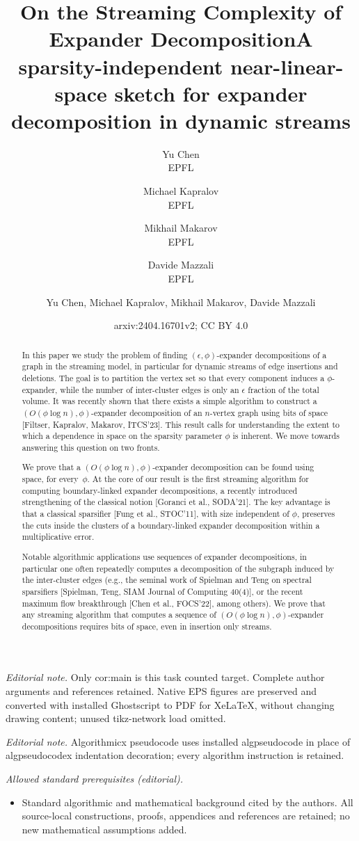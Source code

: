 \documentclass[epsfig,letter,11pt]{article}
\title{On the Streaming Complexity of Expander Decomposition}
\author{
	Yu Chen\\
	EPFL\\
	\and
	Michael Kapralov\\
	EPFL\\
	\and
	Mikhail Makarov\\
	EPFL\\
	\and
	Davide Mazzali\\
	EPFL\\}
\date{}
\title{A sparsity-independent near-linear-space sketch for expander decomposition in dynamic streams}
\author{Yu Chen, Michael Kapralov, Mikhail Makarov, Davide Mazzali}
\date{arxiv:2404.16701v2; CC BY 4.0}
\numberwithin{equation}{section}
\begin{document}
\maketitle
\noindent\textit{Editorial note.} Only cor:main is this task counted target. Complete author arguments and references retained. Native EPS figures are preserved and converted with installed Ghostscript to PDF for XeLaTeX, without changing drawing content; unused tikz-network load omitted.\par\medskip
\noindent\textit{Editorial note.} Algorithmicx pseudocode uses installed algpseudocode in place of algpseudocodex indentation decoration; every algorithm instruction is retained.\par\medskip
\noindent\textit{Allowed standard prerequisites (editorial).}\begin{itemize}
\item Standard algorithmic and mathematical background cited by the authors. All source-local constructions, proofs, appendices and references are retained; no new mathematical assumptions added.
\end{itemize}\medskip
\thispagestyle{empty}
\begin{abstract}
\noindent
In this paper we study the problem of finding $(\epsilon, \phi)$-expander decompositions of a graph in the streaming model, in particular for dynamic streams of edge insertions and deletions. The goal is to partition the vertex set so that every component induces a $\phi$-expander, while the number of inter-cluster edges is only an $\epsilon$ fraction of the total volume. It was recently shown that there exists a simple algorithm to construct a $(O(\phi \log n), \phi)$-expander decomposition of an $n$-vertex graph using  bits of space [Filtser, Kapralov, Makarov, ITCS'23]. This result calls for understanding the extent to which a dependence in space on the sparsity parameter $\phi$ is inherent. We move towards answering this question on two fronts.

We prove that a $(O(\phi \log n), \phi)$-expander decomposition can be found using~ space, for every~$\phi$.  At the core of our result is the first streaming algorithm for computing boundary-linked expander decompositions, a recently introduced strengthening of the classical notion [Goranci et al., SODA'21]. The key advantage is that a classical sparsifier [Fung et al., STOC'11], with size independent of $\phi$, preserves the cuts inside the clusters of a boundary-linked expander decomposition within a multiplicative error.

Notable algorithmic applications use sequences of expander decompositions, in particular one often repeatedly computes a decomposition of the subgraph induced by the inter-cluster edges (e.g., the seminal work of Spielman and Teng on spectral sparsifiers [Spielman, Teng, SIAM Journal of Computing 40(4)], or the recent maximum flow breakthrough [Chen et al., FOCS'22], among others). We prove that any streaming algorithm that computes a sequence of $(O(\phi \log n), \phi)$-expander decompositions requires  bits of space, even in insertion only streams.
\end{abstract}
\end{document}
